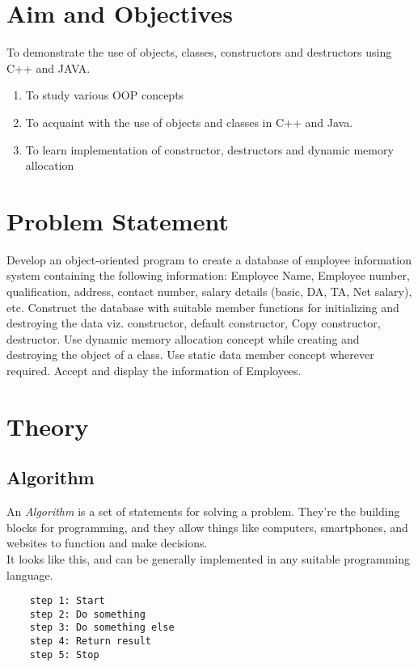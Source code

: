 \documentclass[11pt]{article}
\begin{document}
	
\tableofcontents
\thispagestyle{empty}
\clearpage


\setcounter{page}{1}

\section{Aim and Objectives}
To demonstrate the use of objects, classes, constructors and destructors using C++
and JAVA.
\begin{enumerate}
	\item To study various OOP concepts
	\item To acquaint with the use of objects and classes in C++ and Java.
	\item To learn implementation of constructor, destructors and dynamic memory
	allocation
\end{enumerate}

\section{Problem Statement}

Develop an object-oriented program to create a database of employee information system
containing the following information: Employee Name, Employee number, qualification,
address, contact number, salary details (basic, DA, TA, Net salary), etc. Construct the
database with suitable member functions for initializing and destroying the data viz.
constructor, default constructor, Copy constructor, destructor. Use dynamic memory
allocation concept while creating and destroying the object of a class. Use static data
member concept wherever required. Accept and display the information of Employees.

\section{Theory}

\subsection{Algorithm}
An \textit{Algorithm} is a set of statements for solving a problem. They're the building blocks for programming, and they allow things like computers, smartphones, and websites to function and make decisions.\\

It looks like this, and can be generally implemented in any suitable programming language. 
\begin{lstlisting}
	step 1: Start
	step 2: Do something
	step 3: Do something else
	step 4: Return result
	step 5: Stop
\end{lstlisting}
\end{document}
